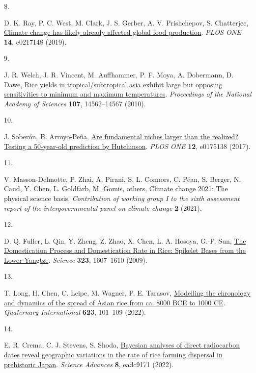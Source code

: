 \documentclass[
  letterpaper,
  DIV=11,
  numbers=noendperiod]{scrartcl}
\newlength{\cslhangindent}
\newlength{\csllabelwidth}
\newenvironment{CSLReferences}[2] %
 {\begin{list}{}{%
  \setlength{\itemindent}{0pt}
  \setlength{\leftmargin}{0pt}
  \setlength{\parsep}{0pt}
  \ifodd #1
   \setlength{\leftmargin}{\cslhangindent}
   \setlength{\itemindent}{-1\cslhangindent}
  \fi
  \setlength{\itemsep}{#2\baselineskip}}}
 {\end{list}}
\newcommand{\CSLLeftMargin}[1]{\parbox[t]{\csllabelwidth}{\strut#1\strut}}
\newcommand{\CSLRightInline}[1]{\parbox[t]{\linewidth - \csllabelwidth}{\strut#1\strut}}
\begin{document}
\begin{CSLReferences}{0}{1}
\CSLLeftMargin{8. }%
\CSLRightInline{D. K. Ray, P. C. West, M. Clark, J. S. Gerber, A. V.
Prishchepov, S. Chatterjee,
\href{https://doi.org/10.1371/journal.pone.0217148}{Climate change has
likely already affected global food production}. \emph{PLOS ONE}
\textbf{14}, e0217148 (2019).}

\CSLLeftMargin{9. }%
\CSLRightInline{J. R. Welch, J. R. Vincent, M. Auffhammer, P. F. Moya,
A. Dobermann, D. Dawe,
\href{https://doi.org/10.1073/pnas.1001222107}{Rice yields in
tropical/subtropical asia exhibit large but opposing sensitivities to
minimum and maximum temperatures}. \emph{Proceedings of the National
Academy of Sciences} \textbf{107}, 14562--14567 (2010).}

\CSLLeftMargin{10. }%
\CSLRightInline{J. Soberón, B. Arroyo-Peña,
\href{https://doi.org/10.1371/journal.pone.0175138}{Are fundamental
niches larger than the realized? Testing a 50-year-old prediction by
Hutchinson}. \emph{PLOS ONE} \textbf{12}, e0175138 (2017).}

\CSLLeftMargin{11. }%
\CSLRightInline{V. Masson-Delmotte, P. Zhai, A. Pirani, S. L. Connors,
C. Péan, S. Berger, N. Caud, Y. Chen, L. Goldfarb, M. Gomis, others,
Climate change 2021: The physical science basis. \emph{Contribution of
working group I to the sixth assessment report of the intergovernmental
panel on climate change} \textbf{2} (2021).}

\CSLLeftMargin{12. }%
\CSLRightInline{D. Q. Fuller, L. Qin, Y. Zheng, Z. Zhao, X. Chen, L. A.
Hosoya, G.-P. Sun, \href{https://doi.org/10.1126/science.1166605}{The
Domestication Process and Domestication Rate in Rice: Spikelet Bases
from the Lower Yangtze}. \emph{Science} \textbf{323}, 1607--1610
(2009).}

\CSLLeftMargin{13. }%
\CSLRightInline{T. Long, H. Chen, C. Leipe, M. Wagner, P. E. Tarasov,
\href{https://doi.org/10.1016/j.quaint.2021.11.016}{Modelling the
chronology and dynamics of the spread of Asian rice from ca. 8000 BCE to
1000 CE}. \emph{Quaternary International} \textbf{623}, 101--109
(2022).}

\CSLLeftMargin{14. }%
\CSLRightInline{E. R. Crema, C. J. Stevens, S. Shoda,
\href{https://doi.org/10.1126/sciadv.adc9171}{Bayesian analyses of
direct radiocarbon dates reveal geographic variations in the rate of
rice farming dispersal in prehistoric Japan}. \emph{Science Advances}
\textbf{8}, eadc9171 (2022).}


\end{CSLReferences}
\end{document}
